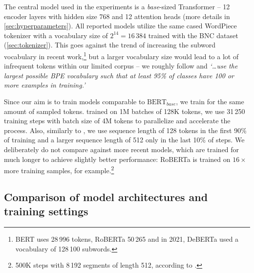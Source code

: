     The central model used in the experiments is a \textit{base}-sized Transformer -- 12 encoder layers with hidden size 768 and 12 attention heads (more details in \cref{sec:hyperparameters}). All reported models utilize the same cased WordPiece tokenizer \citep{https://doi.org/10.48550/arxiv.1609.08144} with a vocabulary size of $2^{14} = 16\,384$ trained with the BNC dataset (\cref{sec:tokenizer}). This goes against the trend of increasing the subword vocabulary in recent work,\footnote{BERT \citep{devlin-etal-2019-bert} uses 28\,996 tokens, RoBERTa \citep{DBLP:journals/corr/abs-1907-11692} 50\,265 and in 2021, DeBERTa \citep{he2021deberta} used a vocabulary of 128\,100 subwords.} but a larger vocabulary size would lead to a lot of infrequent tokens within our limited corpus -- we roughly follow  and \textit{`\dots use the largest possible BPE vocabulary such that at least 95\% of classes have 100 or more examples in training.'}
    
    
Since our aim is to train models comparable to $\textrm{BERT}_\textit{base}$, we train for the same amount of sampled tokens. \citet{devlin-etal-2019-bert} trained on 1M batches of 128K tokens, we use 31\,250 training steps with batch size of 4M tokens to parallelize and accelerate the process. Also, similarly to , we use sequence length of 128 tokens in the first 90\% of training and a larger sequence length of 512 only in the last 10\% of steps. We deliberately do not compare against more recent models, which are trained for much longer to achieve slightly better performance: RoBERTa is trained on $16\times$ more training samples, for example.\footnote{500K steps with 8\,192 segments of length 512, according to \cite{he2021deberta}.}
    
  
\subsection{Comparison of model architectures and training settings}
    
